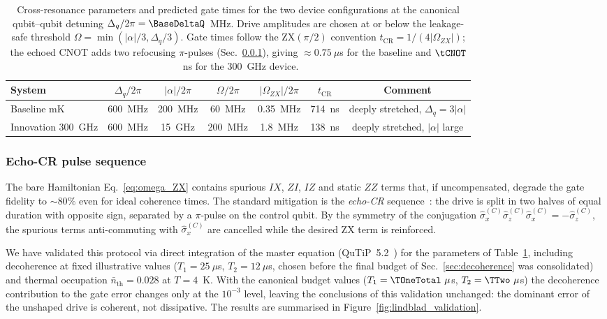 \begin{table}[htbp]
\centering
\footnotesize
\setlength{\tabcolsep}{3pt}
\begin{tabular}{lcccccc}
\toprule
System & $\Delta_q/2\pi$ & $|\alpha|/2\pi$ & $\Omega/2\pi$ & $|\Omega_{ZX}|/2\pi$ &
$t_{\mathrm{CR}}$ & Comment \\
\midrule
Baseline mK         & 600~MHz & 200~MHz & 60~MHz  & 0.35~MHz & 714~ns
                    & deeply stretched, $\Delta_q = 3|\alpha|$ \\
Innovation 300~GHz  & 600~MHz & 15~GHz  & 200~MHz & 1.8~MHz & 138~ns
                    & deeply stretched, $|\alpha|$ large \\
\bottomrule
\end{tabular}
\caption{Cross-resonance parameters and predicted gate times for the two
device configurations at the canonical qubit--qubit detuning
$\Delta_q/2\pi = \BaseDeltaQ$~MHz. Drive amplitudes are chosen at or below the
leakage-safe threshold $\Omega = \min(|\alpha|/3,\Delta_q/3)$. Gate times
follow the ZX$(\pi/2)$ convention $t_{\mathrm{CR}} = 1/(4|\Omega_{ZX}|)$; the
echoed CNOT adds two refocusing $\pi$-pulses (Sec.~\ref{subsec:echoCR}),
giving $\approx 0.75~\mu$s for the baseline and $\tCNOT$~ns for the 300~GHz
device.}
\label{tab:gate_params}
\end{table}

\subsubsection{Echo-CR pulse sequence}
\label{subsec:echoCR}

The bare Hamiltonian Eq.~\eqref{eq:omega_ZX} contains spurious $IX$, $ZI$, $IZ$
and static $ZZ$ terms that, if uncompensated, degrade the gate fidelity to
$\sim 80\%$ even for ideal coherence times. The standard mitigation is the
\emph{echo-CR} sequence~\cite{Sheldon2016}: the drive is split in two halves of
equal duration with opposite sign, separated by a $\pi$-pulse on the control
qubit. By the symmetry of the conjugation $\hat{\sigma}_x^{(C)}
\hat{\sigma}_z^{(C)}\hat{\sigma}_x^{(C)} = -\hat{\sigma}_z^{(C)}$, the
spurious terms anti-commuting with $\hat{\sigma}_x^{(C)}$ are cancelled while
the desired ZX term is reinforced.

We have validated this protocol via direct integration of the master equation
(QuTiP~5.2~\cite{Johansson2013, qutip5}) for the parameters of
Table~\ref{tab:gate_params}, including decoherence at fixed illustrative
values ($T_1=25~\mu$s, $T_2=12~\mu$s, chosen before the final budget of
Sec.~\ref{sec:decoherence} was consolidated) and thermal occupation
$\bar{n}_{\text{th}} = 0.028$ at $T=4$~K. With the canonical budget values
($T_1 = \TOneTotal~\mu$s, $T_2 = \TTwo~\mu$s) the decoherence contribution
to the gate error changes only at the $10^{-3}$ level, leaving the
conclusions of this validation unchanged: the dominant error of the unshaped
drive is coherent, not dissipative. The results are summarised in
Figure~\ref{fig:lindblad_validation}.

